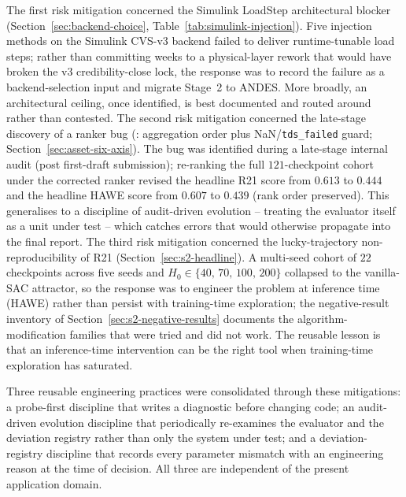 \documentclass{unnc-fyp}
\begin{document}
The first risk mitigation concerned the Simulink LoadStep
architectural blocker (Section~\ref{sec:backend-choice},
Table~\ref{tab:simulink-injection}).
Five injection methods on the Simulink CVS-v3 backend failed to
deliver runtime-tunable load steps; rather than committing
weeks to a physical-layer rework that would have broken the
v3 credibility-close lock, the response was to record the
failure as a backend-selection input and migrate Stage~2 to
ANDES.
More broadly, an architectural ceiling, once identified, is best
documented and routed around rather than contested.
The second risk mitigation concerned the late-stage discovery of
a ranker bug (: aggregation order plus
NaN/\verb|tds_failed| guard; Section~\ref{sec:asset-six-axis}).
The bug was identified during a late-stage internal audit
(post first-draft submission);
re-ranking the full $121$-checkpoint cohort under the corrected
ranker revised the headline R21 score from $0.613$ to $0.444$
and the headline HAWE score from $0.607$ to $0.439$ (rank order
preserved).
This generalises to a discipline of audit-driven evolution --
treating the evaluator itself as a unit under test -- which
catches errors that would otherwise propagate into the final
report.
The third risk mitigation concerned the lucky-trajectory
non-reproducibility of R21
(Section~\ref{sec:s2-headline}).
A multi-seed cohort of $22$ checkpoints across five seeds and
$H_0 \in \{40,\,70,\,100,\,200\}$ collapsed to the vanilla-SAC
attractor, so the response was to engineer the problem at
inference time (HAWE) rather than persist with training-time
exploration; the negative-result inventory of
Section~\ref{sec:s2-negative-results} documents the
algorithm-modification families that were tried and did not
work.
The reusable lesson is that an inference-time intervention can
be the right tool when training-time exploration has saturated.

Three reusable engineering practices were consolidated through
these mitigations: a probe-first discipline that writes a
diagnostic before changing code; an audit-driven evolution
discipline that periodically re-examines the evaluator and the
deviation registry rather than only the system under test; and a
deviation-registry discipline that records every parameter
mismatch with an engineering reason at the time of decision.
All three are independent of the present application domain.

\appendix
\end{document}
